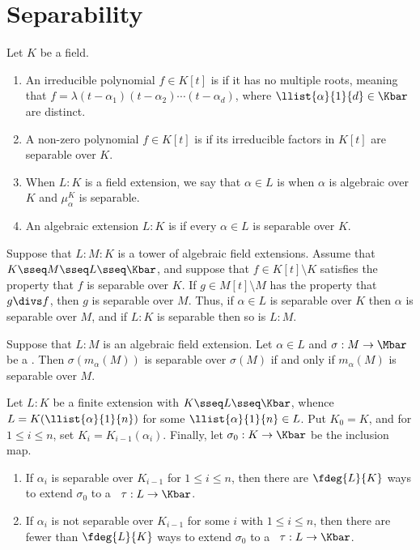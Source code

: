\documentclass[a4paper]{article}
\begin{document}
\section{Separability}
\begin{tdefinition}[Separable]
  Let $ K $ be a field. \begin{enumerate}[label=(\roman*)]
    \item An irreducible polynomial $ f\in K[t] $ is  if it has no multiple roots, meaning that $ f=\lambda(t-\alpha_1)(t-\alpha_2)\cdots(t-\alpha_d) $, where $ \llist{\alpha}{1}{d}\in \Kbar $ are distinct.
    \item A non-zero polynomial $ f\in K[t] $ is  if its irreducible factors in $ K[t] $ are separable over $ K $.
    \item When $ L:K $ is a field extension, we say that $ \alpha \in L $ is  when $ \alpha $ is algebraic over $ K $ and $ \mu_\alpha^K $ is separable.
    \item An algebraic extension $ L:K $ is  if every $ \alpha\in L $ is separable over $ K $.
  \end{enumerate}
\end{tdefinition}

\begin{tlemma}
  Suppose that $ L:M:K $ is a tower of algebraic field extensions.
  Assume that $ K\sseq M\sseq L\sseq \Kbar $, and suppose that $ f\in K[t]\setminus K $ satisfies the property that $ f $ is separable over $ K $.
  If $ g\in M[t]\setminus M $ has the property that $ g\divs f $, then $ g $ is separable over $ M $.
  Thus, if $ \alpha\in L $ is separable over $ K $ then $ \alpha $ is separable over $ M $, and if $ L:K $ is separable then so is $ L:M $.
\end{tlemma}

\begin{tlemma}
Suppose that $ L:M $ is an algebraic field extension.
  Let $ \alpha\in L $ and $ \sigma:M\to\Mbar $ be a \homo.
  Then $ \sigma(m_\alpha(M)) $ is separable over $ \sigma(M) $ if and only if $ m_\alpha(M) $ is separable over $ M $.
\end{tlemma}

\begin{ttheorem}
  Let $ L:K $ be a finite extension with $ K\sseq L\sseq \Kbar $, whence $ L=K(\llist{\alpha}{1}{n}) $ for some $ \llist{\alpha}{1}{n}\in L $.
  Put $ K_0=K $, and for $ 1\leq i\leq n $, set $ K_i=K_{i-1}(\alpha_i) $.
  Finally, let $ \sigma_0:K\to\Kbar $ be the inclusion map. \begin{enumerate}[label=(\roman*)]
    \item If $ \alpha_i $ is separable over $ K_{i-1} $ for $ 1\leq i\leq n $, then there are $ \fdeg{L}{K} $ ways to extend $ \sigma_0 $ to a \homo~$ \tau:L\to \Kbar $.
    \item If $ \alpha_i $ is not separable over $ K_{i-1} $ for some $ i $ with $ 1\leq i\leq n $, then there are fewer than $ \fdeg{L}{K} $ ways to extend $ \sigma_0 $ to a \homo~$ \tau:L\to \Kbar $.
  \end{enumerate}
\end{ttheorem}
\end{document}
